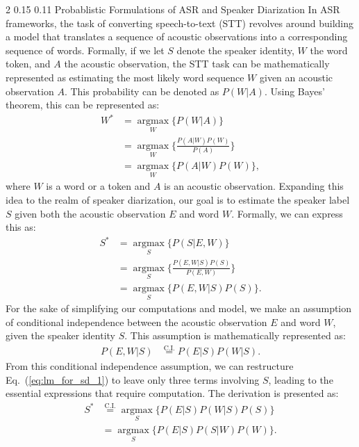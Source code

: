 \documentclass{article}
\makeatletter
\renewcommand{\subsection}{\@startsection
  {subsection}%
  {2}%
  {}%
  {0.15\baselineskip}%
  {0.11\baselineskip}%
  {}}%
\makeatother
\begin{document}
\subsection{Probablistic Formulations of ASR and Speaker Diarization}
In ASR frameworks, the task of converting speech-to-text (STT) revolves around building a model that translates a sequence of acoustic observations into a corresponding sequence of words. Formally, if we let $S$ denote the speaker identity, $W$ the word token, and $A$ the acoustic observation, the STT task can be mathematically represented as estimating the most likely word sequence $W$ given an acoustic observation $A$. This probability can be denoted as $P(W|A)$. Using Bayes' theorem, this can be represented as:
\begin{align}
W^{*} &= \operatorname*{argmax}_{W} \big\{P(W|A) \big\} \label{eq:lm_for_asr_1}\\ 
      &= \operatorname*{argmax}_{W} \Bigg\{\frac{P(A|W)P(W)}{P(A)} \Bigg\} \label{eq:lm_for_asr_2}\\ 
      &= \operatorname*{argmax}_{W} \big\{ P(A|W)P(W) \big\}, \label{eq:lm_for_asr_3}
\end{align}
where $W$ is a word or a token and $A$ is an acoustic observation. Expanding this idea to the realm of speaker diarization, our goal is to estimate the speaker label $S$ given both the acoustic observation $E$ and word $W$. Formally, we can express this as:
\begin{align}
S^{*} &=\operatorname*{argmax}_{S} \{ P(S|E,W) \} \label{eq:lm_for_sd_1} \\
      &=\operatorname*{argmax}_{S} \Bigg\{ \frac{P(E,W|S)P(S)}{P(E,W)} \Bigg\}  \label{eq:lm_for_sd_2}\\
      &=\operatorname*{argmax}_{S} \{ P(E,W|S)P(S) \} \label{eq:lm_for_sd_3}.
\end{align}
For the sake of simplifying our computations and model, we make an assumption of conditional independence between the acoustic observation $E$ and word $W$, given the speaker identity $S$. This assumption is mathematically represented as:
\begin{align}
P(E,W|S)&\overset{\mathrm{C.I.}}{=}P(E|S)P(W|S).
\label{eq:cond_indep}
\end{align}
From this conditional independence assumption, we can restructure Eq.~(\ref{eq:lm_for_sd_1}) to leave only three terms involving $S$, leading to the essential expressions that require computation. The derivation is presented as:
\begin{align}
S^{*} &\overset{\mathrm{C.I.}}{=}\operatorname*{argmax}_{S} \bigl\{ P(E|S)P(W|S)P(S) \bigr\} \label{eq:sd_lm_with_ci_1}\\
      &=\operatorname*{argmax}_{S} \bigl\{ P(E|S)P(S|W)P(W) \bigr\}. \label{eq:sd_lm_with_ci_2}
\end{align}
\end{document}

